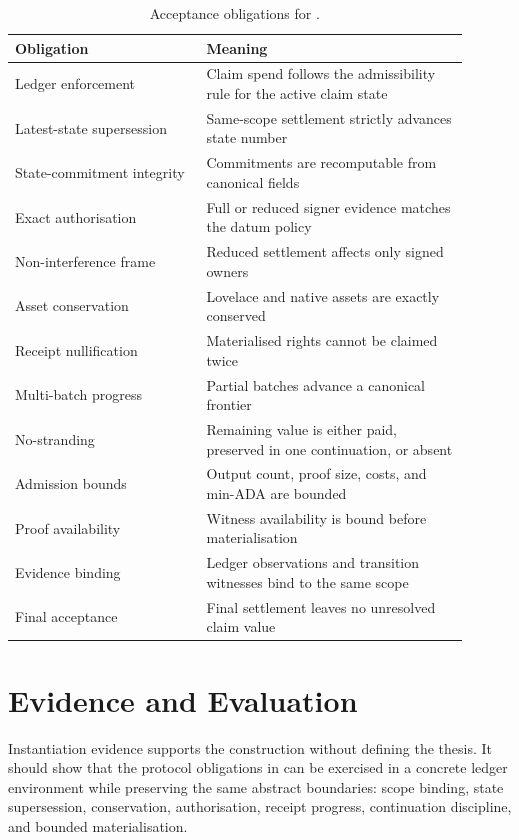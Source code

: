 \documentclass[a4paper,11pt]{article}
\theoremstyle{definition}
\theoremstyle{plain}
\theoremstyle{remark}
\begin{document}
\begin{longtable}{L{0.38\linewidth}L{0.52\linewidth}}
\caption{Acceptance obligations for .}
\\
\toprule
\textbf{Obligation} & \textbf{Meaning}\\
\midrule
\endhead
Ledger enforcement & Claim spend follows the admissibility rule for the active claim state\\
Latest-state supersession & Same-scope settlement strictly advances state number\\
State-commitment integrity & Commitments are recomputable from canonical fields\\
Exact authorisation & Full or reduced signer evidence matches the datum policy\\
Non-interference frame & Reduced settlement affects only signed owners\\
Asset conservation & Lovelace and native assets are exactly conserved\\
Receipt nullification & Materialised rights cannot be claimed twice\\
Multi-batch progress & Partial batches advance a canonical frontier\\
No-stranding & Remaining value is either paid, preserved in one continuation, or absent\\
Admission bounds & Output count, proof size, costs, and min-ADA are bounded\\
Proof availability & Witness availability is bound before materialisation\\
Evidence binding & Ledger observations and transition witnesses bind to the same scope\\
Final acceptance & Final settlement leaves no unresolved claim value\\
\bottomrule
\end{longtable}

\section{Evidence and Evaluation}
\label{sec:evidence}

Instantiation evidence supports the construction without defining the thesis.
It should show that the protocol obligations in  can be
exercised in a concrete ledger environment while preserving the same abstract
boundaries: scope binding, state supersession, conservation, authorisation,
receipt progress, continuation discipline, and bounded materialisation.
\end{document}

